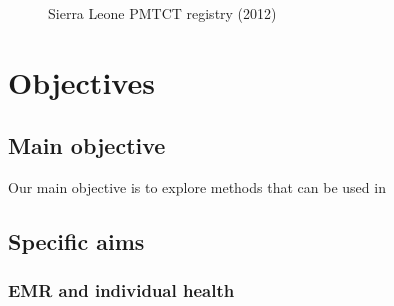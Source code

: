 \documentclass[a4paper,11pt,final,twoside]{article}
\begin{document}
\begin{figure}[ht]
\begin{center}
\caption{Sierra Leone PMTCT registry (2012)}
\end{center}
\end{figure}

\section{Objectives}
	
	\subsection{Main objective}

Our main objective is to explore methods that can be used in 
	
	\subsection{Specific aims}
	\subsubsection{EMR and individual health}
\end{document}
